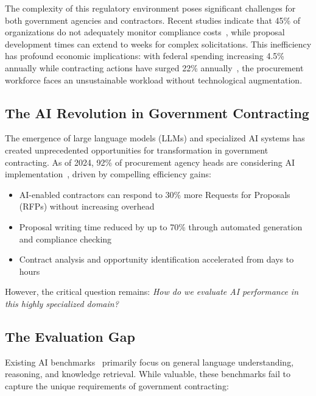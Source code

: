 \documentclass[11pt,a4paper]{article}
\begin{document}
The complexity of this regulatory environment poses significant challenges for both government agencies and contractors. Recent studies indicate that 45\% of organizations do not adequately monitor compliance costs~\citep{thomson2024compliance}, while proposal development times can extend to weeks for complex solicitations. This inefficiency has profound economic implications: with federal spending increasing 4.5\% annually while contracting actions have surged 22\% annually~\citep{omb2024}, the procurement workforce faces an unsustainable workload without technological augmentation.

\subsection{The AI Revolution in Government Contracting}

The emergence of large language models (LLMs) and specialized AI systems has created unprecedented opportunities for transformation in government contracting. As of 2024, 92\% of procurement agency heads are considering AI implementation~\citep{gartner2024gov}, driven by compelling efficiency gains:

\begin{itemize}
    \item AI-enabled contractors can respond to 30\% more Requests for Proposals (RFPs) without increasing overhead~\citep{deloitte2024ai}
    \item Proposal writing time reduced by up to 70\% through automated generation and compliance checking~\citep{accenture2024}
    \item Contract analysis and opportunity identification accelerated from days to hours
\end{itemize}

However, the critical question remains: \textit{How do we evaluate AI performance in this highly specialized domain?}

\subsection{The Evaluation Gap}

Existing AI benchmarks~\citep{wang2019glue, hendrycks2021mmlu, srivastava2023beyond} primarily focus on general language understanding, reasoning, and knowledge retrieval. While valuable, these benchmarks fail to capture the unique requirements of government contracting:
\end{document}
